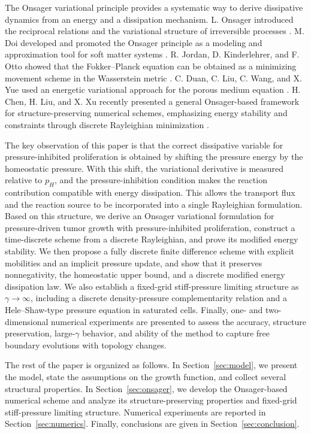 \documentclass[11pt]{article}
\theoremstyle{plain}
\numberwithin{equation}{section}
\begin{document}
The Onsager variational principle provides a systematic way to derive
dissipative dynamics from an energy and a dissipation mechanism. L. Onsager
introduced the reciprocal relations and the variational structure of
irreversible processes \cite{Onsager1931a,Onsager1931b}. M. Doi developed and promoted 
the Onsager principle as a modeling and approximation tool for soft matter
systems \cite{Doi2013,Doi2015}. R. Jordan, D. Kinderlehrer, and F. Otto
showed that the Fokker--Planck equation can be obtained as a minimizing
movement scheme in the Wasserstein metric \cite{JordanKinderlehrerOtto1998}.
C. Duan, C. Liu, C. Wang, and X. Yue used an energetic variational approach
for the porous medium equation \cite{DuanLiuWangYue2019}. H. Chen, H. Liu,
and X. Xu recently presented a general Onsager-based framework for
structure-preserving numerical schemes, emphasizing energy stability and
constraints through discrete Rayleighian minimization \cite{ChenLiuXu2025}.

The key observation of this paper is that the correct dissipative variable for
pressure-inhibited proliferation is obtained by shifting the pressure energy by
the homeostatic pressure. With this shift, the variational derivative is
measured relative to $p_H$, and the pressure-inhibition condition makes the
reaction contribution compatible with energy dissipation. This allows the
transport flux and the reaction source to be incorporated into a single
Rayleighian formulation. Based on this structure, we derive an Onsager
variational formulation for pressure-driven tumor growth with
pressure-inhibited proliferation, construct a time-discrete scheme from a
discrete Rayleighian, and prove its modified energy stability. We then propose
a fully discrete finite difference scheme with explicit mobilities and an
implicit pressure update, and show that it preserves nonnegativity, the
homeostatic upper bound, and a discrete modified energy dissipation law. We
also establish a fixed-grid stiff-pressure limiting structure as
$\gamma\to\infty$, including a discrete density-pressure complementarity
relation and a Hele--Shaw-type pressure equation in saturated cells. Finally, one- and two-dimensional numerical experiments are presented to assess the accuracy, structure preservation, large-$\gamma$ behavior, and ability of
the method to capture free boundary evolutions with topology changes.


The rest of the paper is organized as follows. In Section~\ref{sec:model},
we present the model, state the assumptions on the growth function, and
collect several structural properties. In Section~\ref{sec:onsager},  we develop the Onsager-based numerical scheme and analyze its
structure-preserving properties and fixed-grid stiff-pressure limiting structure. Numerical experiments are reported in
Section~\ref{sec:numerics}. Finally, conclusions are given in
Section~\ref{sec:conclusion}.
\end{document}
